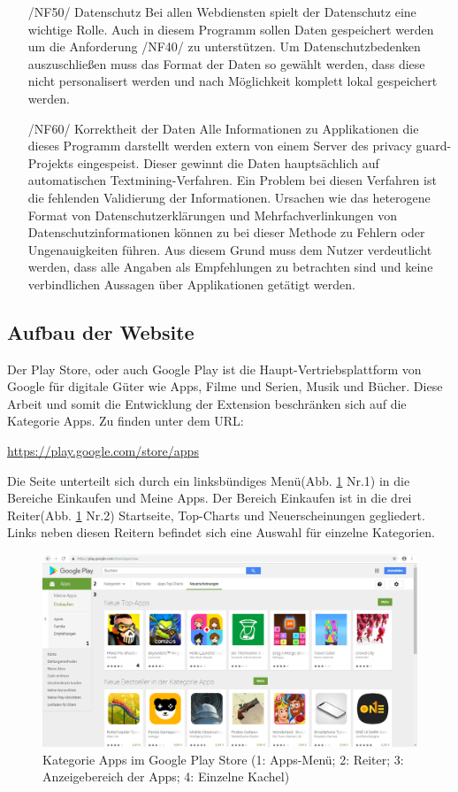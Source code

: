 \begin{itemize}
	\item[/NF50/] Datenschutz
	Bei allen Webdiensten spielt der Datenschutz eine wichtige Rolle. Auch in diesem Programm sollen Daten gespeichert werden um die Anforderung /NF40/ zu unterstützen. Um Datenschutzbedenken auszuschließen muss das Format der Daten so gewählt werden, dass diese nicht personalisert werden und nach Möglichkeit komplett lokal gespeichert werden.
	\item[/NF60/] Korrektheit der Daten
	Alle Informationen zu Applikationen die dieses Programm darstellt werden extern von einem Server des privacy guard-Projekts eingespeist. Dieser gewinnt die Daten hauptsächlich auf automatischen Textmining-Verfahren. Ein Problem bei diesen Verfahren ist die fehlenden Validierung der Informationen. Ursachen wie das heterogene Format von Datenschutzerklärungen und Mehrfachverlinkungen von Datenschutzinformationen können zu bei dieser Methode zu Fehlern oder Ungenauigkeiten führen. Aus diesem Grund muss dem Nutzer verdeutlicht werden, dass alle Angaben als Empfehlungen zu betrachten sind und keine verbindlichen Aussagen über Applikationen getätigt werden.
\end{itemize}
\subsection{Aufbau der Website}
\label{ss:aufbauwebsite}

Der Play Store, oder auch \glqq Google Play\grqq{} ist die Haupt-Vertriebsplattform von Google für digitale Güter wie Apps, Filme und Serien, Musik und Bücher. Diese Arbeit und somit die Entwicklung der Extension beschränken sich auf die Kategorie \glqq Apps\grqq{}. Zu finden unter dem URL:

\glqq \url{https://play.google.com/store/apps}\grqq{}

Die Seite unterteilt sich durch ein linksbündiges Menü(Abb. \ref{playstore1} Nr.1) in die Bereiche \glqq Einkaufen\grqq{} und \glqq Meine Apps\grqq{}. Der Bereich \glqq Einkaufen\grqq{} ist in die drei Reiter(Abb. \ref{playstore1} Nr.2) \glqq Startseite\grqq{}, \glqq Top-Charts\grqq{} und \glqq Neuerscheinungen\grqq{} gegliedert. Links neben diesen Reitern befindet sich eine Auswahl für einzelne Kategorien.

\begin{figure}[ht]
	\centering
	\includegraphics[width=1\textwidth]{pics/playstore1num.png}
	\caption{Kategorie Apps im Google Play Store (1: Apps-Menü; 2: Reiter; 3: Anzeigebereich der Apps; 4: Einzelne Kachel)}
	\label{playstore1}
\end{figure}

